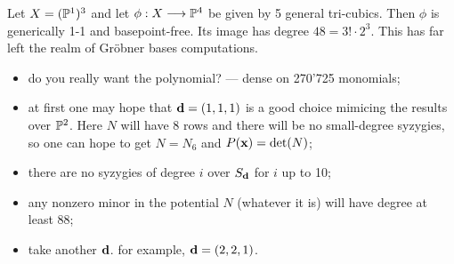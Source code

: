 \documentclass[]{beamer}
\begin{document}
\begin{frame}
\begin{algorithm}[{\tt LinearNi}]
\begin{algorithmic}
	\EndFor
\end{algorithmic}
\end{algorithm}
\end{frame}

\begin{frame}
\begin{example}
	Let $X=(\mathbb{P}^1)^3$ and let $\phi:X\longrightarrow\mathbb{P}^4$ be given by 5 general tri-cubics.
	Then $\phi$ is generically 1-1 and basepoint-free. Its image has degree $48=3!\cdot2^3$.
	This has far left the realm of Gr\"obner bases computations.
	
	\begin{itemize}
		\item do you really want the polynomial? --- dense on 270'725 monomials;
		\item
		at first one may hope that $\mathbf d=(1,1,1)$ is a good choice mimicing the results over $\mathbb{P}^2$.
		Here $N$ will have $8$ rows and there will be no small-degree syzygies, so
		one can hope to get $N=N_6$ and $P(\mathbf x)=\det(N)$;
		\item there are no syzygies of degree $i$ over $S_\mathbf d$ for $i$ up to 10;
		\item any nonzero minor in the potential $N$ (whatever it is) will have degree at least 88;
		\item<2-> take another $\mathbf d$. for example, $\mathbf d=(2,2,1)$.
	\end{itemize}
\end{example}
\end{frame}
\end{document}
